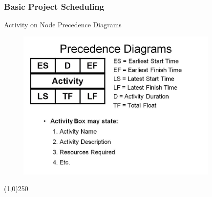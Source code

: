 
\begin{frame}
	\frametitle{Basic Project Scheduling}
	\begin{block}{Activity on Node}
		Precedence Diagrams		
	\end{block}
\end{frame}



\begin{frame}
\begin{figure}
	\centering
		\includegraphics[width = 10.0cm]{oldnotes/Slide125.jpg}
\end{figure}
\end{frame}
\begin{center}\line(1,0){250}\end{center}


